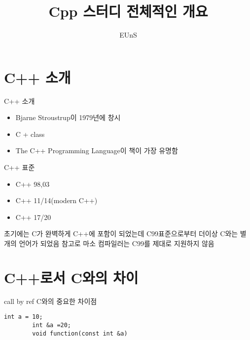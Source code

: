 \documentclass[10pt]{beamer}
\title{Cpp 스터디 전체적인 개요}
\author{EUnS}
\begin{document}

\begin{frame}
    \maketitle
\end{frame}    

\begin{frame}
    \tableofcontents

\end{frame}    

\section{C++ 소개}

\begin{frame}{C++ 소개}
    \begin{itemize}
        \item Bjarne Stroustrup이 1979년에 창시
        \item C + class
        \item The C++ Programming Language이 책이 가장 유명함
    \end{itemize}
\end{frame}

\begin{frame}{C++ 표준}
    \begin{itemize}
        \item C++ 98,03
        \item C++ 11/14(modern C++)
        \item C++ 17/20~
    \end{itemize}
    초기에는 C가 완벽하게 C++에 포함이 되었는데 C99표준으로부터 더이상 C와는 별개의 언어가 되었음 참고로 마소 컴파일러는 C99를 제대로 지원하지 않음
\end{frame}

\section{C++로서 C와의 차이}

\begin{frame}[fragile]{call by ref}
    C와의 중요한 차이점
    \begin{lstlisting}[style = CppStyle]
        int a = 10;
        int &a =20;
        void function(const int &a)
    \end{lstlisting}
\end{frame}
\end{document}
